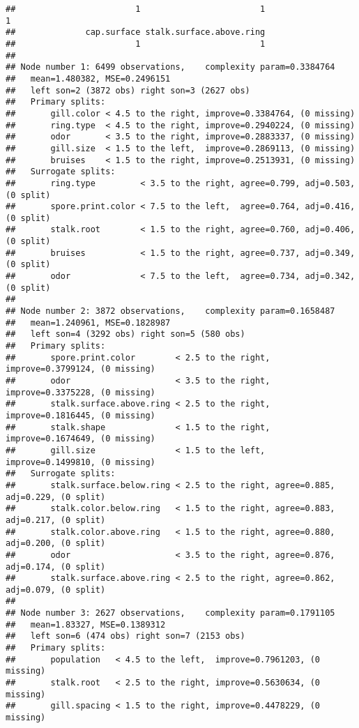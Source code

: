 \documentclass[
]{article}
\begin{document}
\begin{verbatim}
##                        1                        1                        1 
##              cap.surface stalk.surface.above.ring 
##                        1                        1 
## 
## Node number 1: 6499 observations,    complexity param=0.3384764
##   mean=1.480382, MSE=0.2496151 
##   left son=2 (3872 obs) right son=3 (2627 obs)
##   Primary splits:
##       gill.color < 4.5 to the right, improve=0.3384764, (0 missing)
##       ring.type  < 4.5 to the right, improve=0.2940224, (0 missing)
##       odor       < 3.5 to the right, improve=0.2883337, (0 missing)
##       gill.size  < 1.5 to the left,  improve=0.2869113, (0 missing)
##       bruises    < 1.5 to the right, improve=0.2513931, (0 missing)
##   Surrogate splits:
##       ring.type         < 3.5 to the right, agree=0.799, adj=0.503, (0 split)
##       spore.print.color < 7.5 to the left,  agree=0.764, adj=0.416, (0 split)
##       stalk.root        < 1.5 to the right, agree=0.760, adj=0.406, (0 split)
##       bruises           < 1.5 to the right, agree=0.737, adj=0.349, (0 split)
##       odor              < 7.5 to the left,  agree=0.734, adj=0.342, (0 split)
## 
## Node number 2: 3872 observations,    complexity param=0.1658487
##   mean=1.240961, MSE=0.1828987 
##   left son=4 (3292 obs) right son=5 (580 obs)
##   Primary splits:
##       spore.print.color        < 2.5 to the right, improve=0.3799124, (0 missing)
##       odor                     < 3.5 to the right, improve=0.3375228, (0 missing)
##       stalk.surface.above.ring < 2.5 to the right, improve=0.1816445, (0 missing)
##       stalk.shape              < 1.5 to the right, improve=0.1674649, (0 missing)
##       gill.size                < 1.5 to the left,  improve=0.1499810, (0 missing)
##   Surrogate splits:
##       stalk.surface.below.ring < 2.5 to the right, agree=0.885, adj=0.229, (0 split)
##       stalk.color.below.ring   < 1.5 to the right, agree=0.883, adj=0.217, (0 split)
##       stalk.color.above.ring   < 1.5 to the right, agree=0.880, adj=0.200, (0 split)
##       odor                     < 3.5 to the right, agree=0.876, adj=0.174, (0 split)
##       stalk.surface.above.ring < 2.5 to the right, agree=0.862, adj=0.079, (0 split)
## 
## Node number 3: 2627 observations,    complexity param=0.1791105
##   mean=1.83327, MSE=0.1389312 
##   left son=6 (474 obs) right son=7 (2153 obs)
##   Primary splits:
##       population   < 4.5 to the left,  improve=0.7961203, (0 missing)
##       stalk.root   < 2.5 to the right, improve=0.5630634, (0 missing)
##       gill.spacing < 1.5 to the right, improve=0.4478229, (0 missing)

\end{verbatim}
\end{document}
